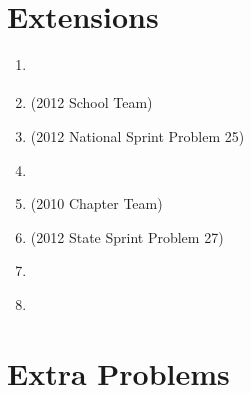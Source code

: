 \documentclass{article}
\begin{document}
\section*{Extensions}
\vspace{1cm}
\begin{enumerate}
\item \underline{\hspace{3in}}\vspace{1cm}
\item \underline{\hspace{3in}} (2012 School Team)\vspace{1cm}
\item \underline{\hspace{3in}} (2012 National Sprint Problem 25)\vspace{1cm}
\item \underline{\hspace{3in}}\vspace{1cm}
\item \underline{\hspace{3in}} (2010 Chapter Team)\vspace{1cm}
\item \underline{\hspace{3in}} (2012 State Sprint Problem 27)\vspace{1cm}
\item \underline{\hspace{3in}}\vspace{1cm}
\item \underline{\hspace{3in}}
\end{enumerate}


\newpage

\section*{Extra Problems}
\end{document}
